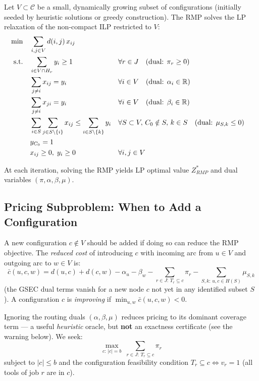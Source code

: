 \documentclass[11pt,a4paper]{article}
\theoremstyle{plain}
\theoremstyle{definition}
\begin{document}
Let $V \subset \mathcal{C}$ be a small, dynamically growing subset of
configurations (initially seeded by heuristic solutions or greedy construction).
The RMP solves the LP relaxation of the non-compact ILP restricted to $V$:
\begin{align}
\min \quad & \sum_{i,j \in V} d(i,j)\, x_{ij} \label{eq:rmp_obj}\\
\text{s.t.}\quad
& \sum_{i \in V \cap H_r} y_i \ge 1 && \forall r \in J
  \quad (\text{dual: } \pi_r \ge 0) \label{eq:rmp_cover}\\
& \sum_{j \ne i} x_{ij} = y_i && \forall i \in V
  \quad (\text{dual: } \alpha_i \in \mathbb{R}) \label{eq:rmp_flowin}\\
& \sum_{j \ne i} x_{ji} = y_i && \forall i \in V
  \quad (\text{dual: } \beta_i \in \mathbb{R}) \label{eq:rmp_flowout}\\
& \sum_{i \in S}\sum_{j \in S \setminus\{i\}} x_{ij}
  \le \sum_{i \in S \setminus\{k\}} y_i
  && \forall S \subset V,\, C_0 \notin S,\, k \in S
  \quad (\text{dual: } \mu_{S,k} \le 0) \label{eq:rmp_sec}\\
& y_{C_0} = 1 \notag\\
& x_{ij} \ge 0,\; y_i \ge 0 && \forall i,j \in V \notag
\end{align}

At each iteration, solving the RMP yields LP optimal value $Z^*_{RMP}$ and dual
variables $(\pi, \alpha, \beta, \mu)$.

\subsection{Pricing Subproblem: When to Add a Configuration}

A new configuration $c \notin V$ should be added if doing so can reduce the
RMP objective. The \emph{reduced cost} of introducing $c$ with incoming arc from
$u \in V$ and outgoing arc to $w \in V$ is:
\[
  \bar{c}(u,c,w) = d(u,c) + d(c,w) - \alpha_u - \beta_w
  - \sum_{r \in J:\, T_r \subseteq c} \pi_r
  - \sum_{S,k:\, u,c \in H(S)} \mu_{S,k}
\]
(the GSEC dual terms vanish for a new node $c$ not yet in any identified subset
$S$). A configuration $c$ is \emph{improving} if $\min_{u,w} \bar{c}(u,c,w) < 0$.

Ignoring the routing duals $(\alpha,\beta,\mu)$ reduces pricing to its dominant
coverage term --- a useful \emph{heuristic} oracle, but \textbf{not} an exactness
certificate (see the warning below). We seek:
\[
  \max_{c:\, |c|=b} \;\sum_{r \in J:\, T_r \subseteq c} \pi_r
\]
subject to $|c| \le b$ and the configuration feasibility condition
$T_r \subseteq c \iff v_r = 1$ (all tools of job $r$ are in $c$).
\end{document}
